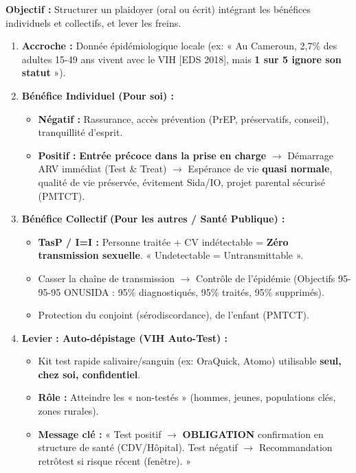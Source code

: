 \documentclass[11pt]{article}
\begin{document}
\begin{methode}
\textbf{Objectif :} Structurer un plaidoyer (oral ou écrit) intégrant les bénéfices individuels et collectifs, et lever les freins.
\begin{enumerate}
    \item \textbf{Accroche :} Donnée épidémiologique locale (ex: « Au Cameroun, 2,7\% des adultes 15-49 ans vivent avec le VIH [EDS 2018], mais \textbf{1 sur 5 ignore son statut} »).
    \item \textbf{Bénéfice Individuel (Pour soi) :}
    \begin{itemize}
        \item \textbf{Négatif :} Rassurance, accès prévention (PrEP, préservatifs, conseil), tranquillité d'esprit.
        \item \textbf{Positif :} \textbf{Entrée précoce dans la prise en charge} $\rightarrow$ Démarrage ARV immédiat (Test \& Treat) $\rightarrow$ Espérance de vie \textbf{quasi normale}, qualité de vie préservée, évitement Sida/IO, projet parental sécurisé (PMTCT).
    \end{itemize}
    \item \textbf{Bénéfice Collectif (Pour les autres / Santé Publique) :}
    \begin{itemize}
        \item \textbf{TasP / I=I :} Personne traitée + CV indétectable = \textbf{Zéro transmission sexuelle}. « Undetectable = Untransmittable ».
        \item Casser la chaîne de transmission $\rightarrow$ Contrôle de l'épidémie (Objectifs 95-95-95 ONUSIDA : 95\% diagnostiqués, 95\% traités, 95\% supprimés).
        \item Protection du conjoint (sérodiscordance), de l'enfant (PMTCT).
    \end{itemize}
    \item \textbf{Levier : Auto-dépistage (VIH Auto-Test) :}
    \begin{itemize}
        \item Kit test rapide salivaire/sanguin (ex: OraQuick, Atomo) utilisable \textbf{seul, chez soi, confidentiel}.
        \item \textbf{Rôle :} Atteindre les « non-testés » (hommes, jeunes, populations clés, zones rurales).
        \item \textbf{Message clé :} « Test positif $\rightarrow$ \textbf{OBLIGATION} confirmation en structure de santé (CDV/Hôpital). Test négatif $\rightarrow$ Recommandation retrôtest si risque récent (fenêtre). »

\end{itemize}
\end{enumerate}
\end{methode}
\end{document}
